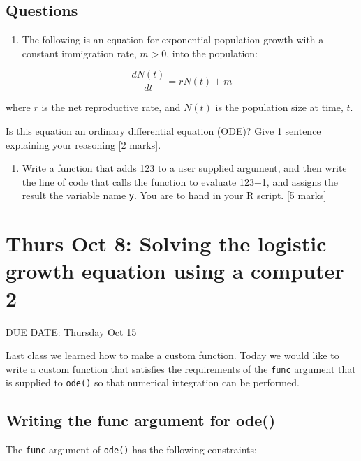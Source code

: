 \documentclass[]{book}
\providecommand{\tightlist}{%
  \setlength{\itemsep}{0pt}\setlength{\parskip}{0pt}}
\begin{document}
\section{Questions}\label{questions}

\begin{enumerate}
\def\labelenumi{\arabic{enumi}.}
\tightlist
\item
  The following is an equation for exponential population growth with a
  constant immigration rate, \(m>0\), into the population:
\end{enumerate}

\[
\frac{dN(t)}{dt}= rN(t) + m
\]

where \(r\) is the net reproductive rate, and \(N(t)\) is the population
size at time, \(t\).

Is this equation an ordinary differential equation (ODE)? Give 1
sentence explaining your reasoning {[}2 marks{]}.

\begin{enumerate}
\def\labelenumi{\arabic{enumi}.}
\setcounter{enumi}{1}
\tightlist
\item
  Write a function that adds 123 to a user supplied argument, and then
  write the line of code that calls the function to evaluate 123+1, and
  assigns the result the variable name \texttt{y}. You are to hand in
  your R script. {[}5 marks{]}
\end{enumerate}

\chapter{Thurs Oct 8: Solving the logistic growth equation using a
computer
2}\label{thurs-oct-8-solving-the-logistic-growth-equation-using-a-computer-2}

DUE DATE: Thursday Oct 15

Last class we learned how to make a custom function. Today we would like
to write a custom function that satisfies the requirements of the
\texttt{func} argument that is supplied to \texttt{ode()} so that
numerical integration can be performed.

\section{Writing the func argument for
ode()}\label{writing-the-func-argument-for-ode}

The \texttt{func} argument of \texttt{ode()} has the following
constraints:
\end{document}
